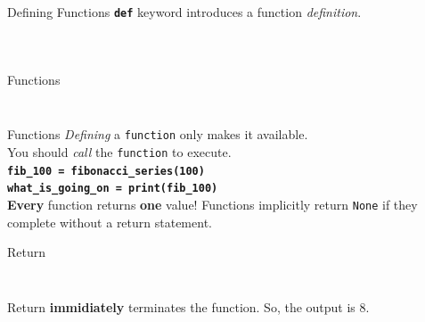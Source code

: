         \begin{frame}{Defining Functions}
            \pause
            \LARGE
            \textbf{\texttt{def}} keyword introduces a function \textit{definition}.
            \normalsize
            \pause
            \inputminted[frame=single,framesep=2pt, lastline=8]{python3}{code-examples/function_def.py}
            \pause
            \inputminted[frame=single,framesep=2pt, lastline=8]{python3}{code-examples/function_def2.py}
            \pause
            \inputminted[frame=single,framesep=2pt, lastline=8]{python3}{code-examples/function_def3.py}
        \end{frame}


        \begin{frame}{Functions}
            \inputminted[frame=single,framesep=2pt]{python3}{code-examples/function_ex.py}
            \pause
            \inputminted[frame=single,framesep=2pt]{python3}{code-examples/function_ex2.py}
        \end{frame}

        \begin{frame}{Functions}
            \LARGE
            \textit{Defining} a \texttt{function} only makes it available.\\
            \pause 
            You should \textit{call} the \texttt{function} to execute.\\           
            \pause
            \newline
            \textbf{\texttt{fib\_100 = fibonacci\_series(100)}}\\
            \pause
            \textbf{\texttt{what\_is\_going\_on = print(fib\_100)}}\\
            \newline
            \pause
            \textbf{Every} function returns \textbf{one} value! \pause Functions implicitly return \texttt{None} if they complete without a return statement.
        \end{frame}

        \begin{frame}{Return}
            \LARGE
            \pause
            \inputminted[frame=single,framesep=2pt]{python3}{code-examples/return.py}
            \pause
            \inputminted[frame=single,framesep=2pt]{python3}{code-examples/return.py}
            \pause
            Return \textbf{immidiately} terminates the function. So, the output is 8.
        \end{frame}

